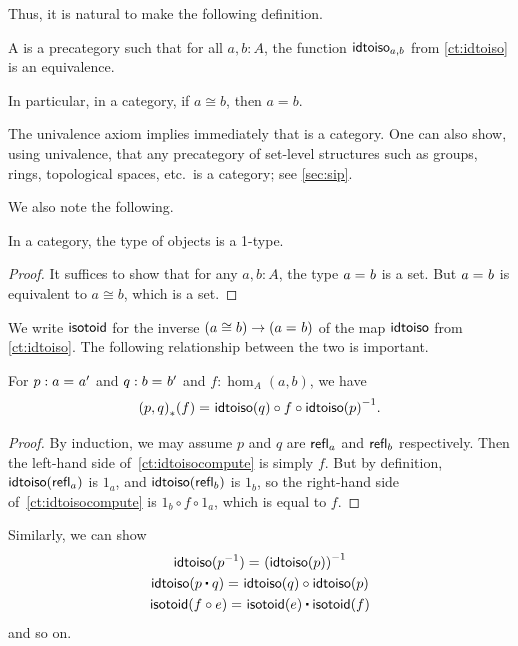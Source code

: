 Thus, it is natural to make the following definition.

\begin{defn}\label{ct:category}
  A 
  is a precategory such that for all $a,b:A$, the function $\mathsf{idtoiso}_{a,b}$ from \cref{ct:idtoiso} is an equivalence.
\end{defn}

In particular, in a category, if $a\cong b$, then $a=b$.

\begin{eg}\label{ct:eg:set}
  The univalence axiom implies immediately that \uset is a category.
  One can also show, using univalence, that any precategory of set-level structures such as groups, rings, topological spaces, etc.\ is a category; see \cref{sec:sip}.
\end{eg}

We also note the following.

\begin{lem}\label{ct:obj-1type}
  In a category, the type of objects is a 1-type.
\end{lem}
\begin{proof}
  It suffices to show that for any $a,b:A$, the type $a =_{} b$ is a set.
  But $a =_{} b$ is equivalent to $a \cong b$, which is a set.
\end{proof}

We write $\mathsf{isotoid}$ for the inverse $(a\cong b) \to (a =_{} b)$ of the map $\mathsf{idtoiso}$ from \cref{ct:idtoiso}.
The following relationship between the two is important.

\begin{lem}\label{ct:idtoiso-trans}
  For $p:a =_{} a'$ and $q:b =_{} b'$ and $f:\hom_A(a,b)$, we have
  \begin{equation}\label{ct:idtoisocompute}
    \id{\trans{(p,q)}{f}}
    {\idtoiso(q)\circ f \circ \inv{\idtoiso(p)}}.
  \end{equation}
\end{lem}
\begin{proof}
  By induction, we may assume $p$ and $q$ are $\mathsf{refl}_{a}$ and $\mathsf{refl}_{b}$ respectively.
Then the left-hand side of~\eqref{ct:idtoisocompute} is simply $f$.
  But by definition, $\mathsf{idtoiso}(\mathsf{refl}_{a})$ is $1_a$, and $\mathsf{idtoiso}(\mathsf{refl}_{b})$ is $1_b$, so the right-hand side of~\eqref{ct:idtoisocompute} is $1_b\circ f\circ 1_a$, which is equal to $f$.
\end{proof}

Similarly, we can show
\begin{gather}
  \id{\idtoiso(\rev p)}{\inv {(\idtoiso(p))}}\\
  \id{\idtoiso(p\ct q)}{\idtoiso(q)\circ \idtoiso(p)}\\
  \id{\isotoid(f\circ e)}{\isotoid(e)\ct \isotoid(f)}
\end{gather}
and so on.

